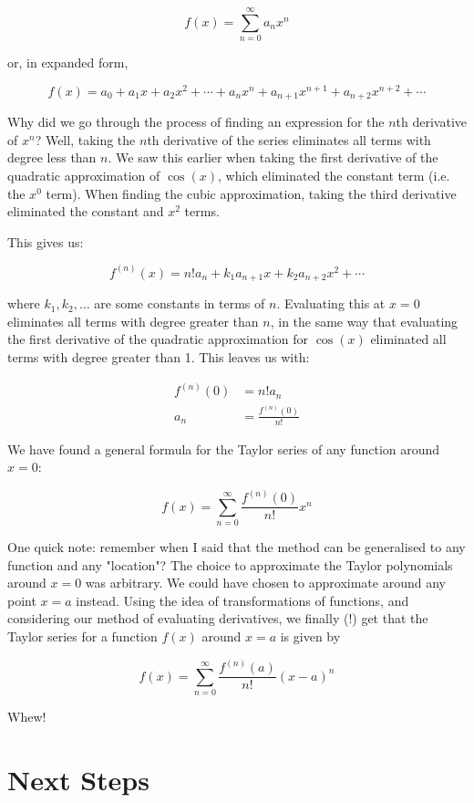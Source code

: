 \documentclass{article}
\begin{document}
$$
f(x) = \sum_{n=0}^{\infty} a_n x^n
$$

or, in expanded form,

$$
f(x) = a_0 + a_1 x + a_2 x^2 + \cdots + a_n x^n + a_{n+1} x^{n+1} + a_{n+2} x^{n+2} + \cdots
$$

Why did we go through the process of finding an expression for the $n$th derivative of $x^n$? Well, taking the $n$th derivative of the series eliminates all terms with degree less than $n$. We saw this earlier when taking the first derivative of the quadratic approximation of $\cos(x)$, which eliminated the constant term (i.e. the $x^0$ term). When finding the cubic approximation, taking the third derivative eliminated the constant and $x^2$ terms.

This gives us:

$$ f^{(n)}(x) = n! a_n + k_1 a_{n+1} x + k_2 a_{n+2} x^2 + \cdots $$

where $k_1, k_2, \ldots$ are some constants in terms of $n$. Evaluating this at $x=0$ eliminates all terms with degree greater than $n$, in the same way that evaluating the first derivative of the quadratic approximation for $\cos(x)$ eliminated all terms with degree greater than 1. This leaves us with:

\begin{align*}
    f^{(n)}(0) &= n! a_n \\
    a_n &= \frac{f^{(n)}(0)}{n!}
\end{align*}

We have found a general formula for the Taylor series of any function around $x=0$:

$$
f(x) = \sum_{n=0}^{\infty} \frac{f^{(n)}(0)}{n!} x^n
$$

One quick note: remember when I said that the method can be generalised to any function and any "location"? The choice to approximate the Taylor polynomials around $x=0$ was arbitrary. We could have chosen to approximate around any point $x=a$ instead. Using the idea of transformations of functions, and considering our method of evaluating derivatives, we finally (!) get that the Taylor series for a function $f(x)$ around $x=a$ is given by

$$
f(x) = \sum_{n=0}^{\infty} \frac{f^{(n)}(a)}{n!} (x-a)^n
$$

Whew!

\newpage
\section*{Next Steps}
\end{document}
